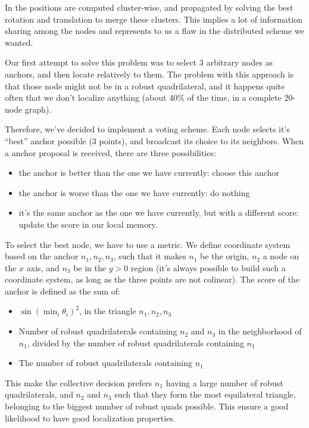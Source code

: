 \documentclass[letterpaper, 10 pt, conference]{ieeeconf}  %
\begin{document}
In \cite{MooreTeller} the positions are computed cluster-wise, and propagated by solving the best rotation and translation to merge these clusters. This implies a lot of information sharing among the nodes and represents to us a flaw in the distributed scheme we wanted.

Our first attempt to solve this problem was to select 3 arbitrary nodes as anchors, and then locate relatively to them. The problem with this approach is that those node might not be in a robust quadrilateral, and it happens quite often that we don't localize anything (about 40\% of the time, in a complete 20-node graph).

Therefore, we've decided to implement a voting scheme. Each node selects it's ``best'' anchor possible (3 points), and broadcast its choice to its neighbors. When a anchor proposal is received, there are three possibilities:
\begin{itemize}
    \item the anchor is better than the one we have currently: choose this anchor
    \item the anchor is worse than the one we have currently: do nothing
    \item it's the same anchor as the one we have currently, but with a different score: update the score in our local memory.
\end{itemize}

To select the best node, we have to use a metric. We define coordinate system based on the anchor $n_1, n_2, n_3$, such that it makes $n_1$ be the origin, $n_2$ a node on the $x$ axis, and $n_3$ be in the $y>0$ region (it's always possible to build such a coordinate system, as long as the three points are not colinear). The score of the anchor is defined as the sum of:
\begin{itemize}
    \item $\sin(\min_i \theta_i)^2$, in the triangle $n_1, n_2, n_3$
    \item Number of robust quadrilaterals containing $n_2$ and $n_3$ in the neighborhood of $n_1$, divided by the number of robust quadrilaterals containing $n_1$
    \item The number of robust quadrilaterals containing $n_1$
\end{itemize}

This make the collective decision prefers $n_1$ having a large number of robust quadrilaterals, and $n_2$ and $n_3$ such that they form the most equilateral triangle, belonging to the biggest number of robust quads possible. This ensure a good likelihood to have good localization properties.
\end{document}
